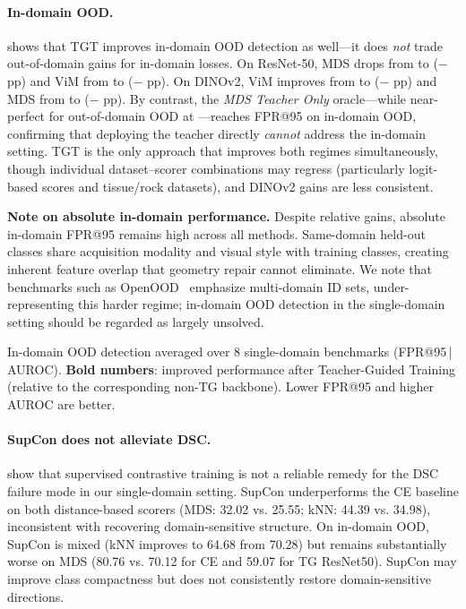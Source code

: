 \documentclass[runningheads]{llncs}
\begin{document}
\paragraph{In-domain OOD.}
 shows that TGT improves in-domain OOD detection as well---it does \emph{not} trade out-of-domain gains for in-domain losses.
On ResNet-50, MDS drops from \NearoodMDSStdResNet{} to \NearoodMDSTGTResNet{} ($-$\NearoodMDSImprovementPPResNet{} pp) and ViM from \NearoodViMStdResNet{} to \NearoodViMTGTResNet{} ($-$\NearoodViMImprovementPPResNet{} pp).
On DINOv2, ViM improves from \NearoodViMStdDino{} to \NearoodViMTGTDino{} ($-$\NearoodViMImprovementPP{} pp) and MDS from \NearoodMDSStdDino{} to \NearoodMDSTGTDino{} ($-$\NearoodMDSImprovementPPDino{} pp).
By contrast, the \emph{MDS Teacher Only} oracle---while near-perfect for out-of-domain OOD at \TeacherOnlyFaroodFPR{}---reaches \TeacherOnlyNearoodFPR{} FPR@95 on in-domain OOD, confirming that deploying the teacher directly \emph{cannot} address the in-domain setting.
TGT is the only approach that improves both regimes simultaneously, though individual dataset--scorer combinations may regress (particularly logit-based scores and tissue/rock datasets), and DINOv2 gains are less consistent.

\noindent\textbf{Note on absolute in-domain performance.}
Despite relative gains, absolute in-domain FPR@95 remains high across all methods.
Same-domain held-out classes share acquisition modality and visual style with training classes, creating inherent feature overlap that geometry repair cannot eliminate.
We note that benchmarks such as OpenOOD~\cite{Yang2022openood} emphasize multi-domain ID sets, under-representing this harder regime; in-domain OOD detection in the single-domain setting should be regarded as largely unsolved.

\begin{table}[t]
  \centering
  \caption{In-domain OOD detection averaged over 8 single-domain benchmarks (FPR@95\,|\,AUROC). \textbf{Bold numbers}: improved performance after Teacher-Guided Training (relative to the corresponding non-TG backbone). Lower FPR@95 and higher AUROC are better.}
  \label{tab:nearood}
  \small
  \begin{adjustbox}{max width=\columnwidth}
  
  \end{adjustbox}
\end{table}

\paragraph{SupCon does not alleviate DSC.}
 show that supervised contrastive training is not a reliable remedy for the DSC failure mode in our single-domain setting.
SupCon underperforms the CE baseline on both distance-based scorers (MDS: 32.02 vs. 25.55; kNN: 44.39 vs. 34.98), inconsistent with recovering domain-sensitive structure.
On in-domain OOD, SupCon is mixed (kNN improves to 64.68 from 70.28) but remains substantially worse on MDS (80.76 vs. 70.12 for CE and 59.07 for TG ResNet50).
SupCon may improve class compactness but does not consistently restore domain-sensitive directions.
\end{document}

